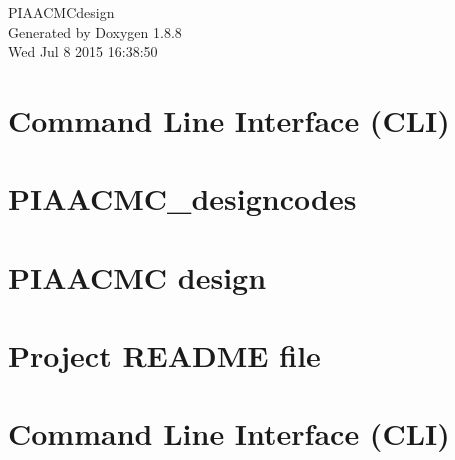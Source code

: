 \documentclass[twoside]{book}
\newcommand{\+}{\discretionary{\mbox{\scriptsize$\hookleftarrow$}}{}{}}
\newcommand{\clearemptydoublepage}{%
  \newpage{\pagestyle{empty}\cleardoublepage}%
}
\begin{document}
\hypersetup{pageanchor=false,
             bookmarks=true,
             bookmarksnumbered=true,
             pdfencoding=unicode
            }
\begin{titlepage}
\vspace*{7cm}
\begin{center}%
{\Large P\+I\+A\+A\+C\+M\+Cdesign }\\
\vspace*{1cm}
{\large Generated by Doxygen 1.8.8}\\
\vspace*{0.5cm}
{\small Wed Jul 8 2015 16:38:50}\\
\end{center}
\end{titlepage}
\clearemptydoublepage
\tableofcontents
\clearemptydoublepage
{}
\hypersetup{pageanchor=true}

\chapter{Command Line Interface (C\+L\+I)}
\label{md_PIAACMCdesign_src_CLIcore}
\hypertarget{md_PIAACMCdesign_src_CLIcore}{}

\chapter{P\+I\+A\+A\+C\+M\+C\+\_\+designcodes}
\label{md_PIAACMCdesign_src_PIAACMCsimul_PIAACMC_designcodes}
\hypertarget{md_PIAACMCdesign_src_PIAACMCsimul_PIAACMC_designcodes}{}

\chapter{P\+I\+A\+A\+C\+M\+C design}
\label{md_PIAACMCdesign_src_PIAACMCsimul_README}
\hypertarget{md_PIAACMCdesign_src_PIAACMCsimul_README}{}

\chapter{Project R\+E\+A\+D\+M\+E file}
\label{md_README}
\hypertarget{md_README}{}

\chapter{Command Line Interface (C\+L\+I)}
\label{md_src_CLIcore}
\hypertarget{md_src_CLIcore}{}

\end{document}
